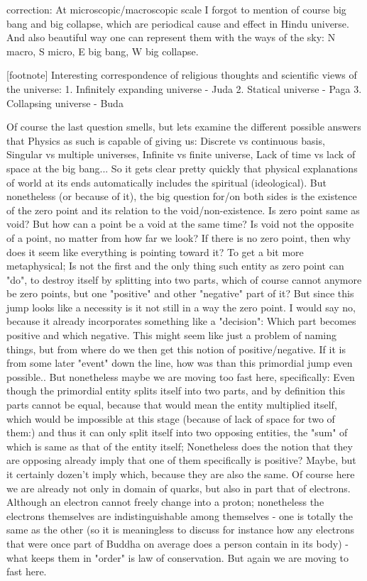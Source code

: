 \documentclass[10pt]{book}
\begin{document}
correction:
At microscopic/macroscopic scale I forgot to mention of course big bang and big collapse, which are periodical cause and effect in Hindu universe. And also beautiful way one can represent them with the ways of the sky: N macro, S micro, E big bang, W big collapse.

[footnote]
Interesting correspondence of religious thoughts and scientific views of the universe:
1. Infinitely expanding universe - Juda
2. Statical universe - Paga
3. Collapsing universe - Buda

Of course the last question smells, but lets examine the different possible answers that Physics as such is capable of giving us: Discrete vs continuous basis, Singular vs multiple universes, Infinite vs finite universe, Lack of time vs lack of space at the big bang... So it gets clear pretty quickly that physical explanations of world at its ends automatically includes the spiritual (ideological).
But nonetheless (or because of it), the big question for/on both sides is the existence of the zero point and its relation to the void/non-existence. Is zero point same as void? But how can a point be a void at the same time? Is void not the opposite of a point, no matter from how far we look? If there is no zero point, then why does it seem like everything is pointing toward it?
To get a bit more metaphysical; Is not the first and the only thing such entity as zero point can "do", to destroy itself by splitting into two parts, which of course cannot anymore be zero points, but one "positive" and other "negative" part of it? But since this jump looks like a necessity is it not still in a way the zero point. I would say no, because it already incorporates something like a "decision": Which part becomes positive and which negative. This might seem like just a problem of naming things, but from where do we then get this notion of positive/negative. If it is from some later "event" down the line, how was than this primordial jump even possible.. But nonetheless maybe we are moving too fast here, specifically: Even though the primordial entity splits itself into two parts, and by definition this parts cannot be equal, because that would mean the entity multiplied itself, which would be impossible at this stage (because of lack of space for two of them:) and thus it can only split itself into two opposing entities, the "sum" of which is same as that of the entity itself; Nonetheless does the notion that they are opposing already imply that one of them specifically is positive? Maybe, but it certainly dozen't imply which, because they are also the same. Of course here we are already not only in domain of quarks, but also in part that of electrons. Although an electron cannot freely change into a proton; nonetheless the electrons themselves are indistinguishable among themselves - one is totally the same as the other (so it is meaningless to discuss for instance how any electrons that were once part of Buddha on average does a person contain in its body) - what keeps them in "order" is law of conservation. But again we are moving to fast here. 
\end{document}
